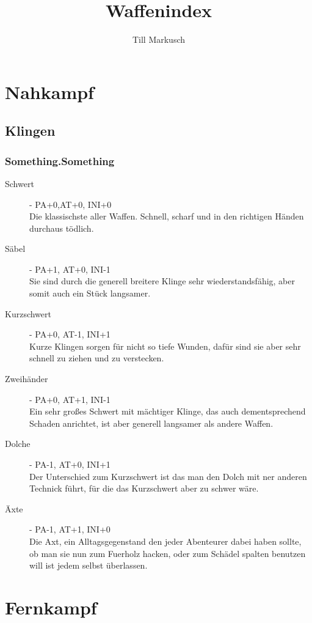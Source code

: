 \documentclass[a4paper,12pt,oneside]{book}
\title{Waffenindex}
\author{Till Markusch}
\date{}
\begin{document}
\maketitle
\tableofcontents

\chapter{Nahkampf}

\section{Klingen}

\subsection{Something.Something}

\begin{description}
\item[Schwert]- PA+0,AT+0, INI+0
\\Die klassischste aller Waffen. Schnell, scharf und in den richtigen Händen durchaus tödlich.
\item[Säbel]- PA+1, AT+0, INI-1
\\Sie sind durch die generell breitere Klinge sehr wiederstandsfähig, aber somit auch ein Stück langsamer.
\item[Kurzschwert] - PA+0, AT-1, INI+1
\\Kurze Klingen sorgen für nicht so tiefe Wunden, dafür sind sie aber sehr schnell zu ziehen und zu verstecken.
\item[Zweihänder] - PA+0, AT+1, INI-1
\\Ein sehr großes Schwert mit mächtiger Klinge, das auch dementsprechend Schaden anrichtet, ist aber generell langsamer als andere Waffen.
\item[Dolche] - PA-1, AT+0, INI+1
\\Der Unterschied zum Kurzschwert ist das man den Dolch mit ner anderen Technick führt, für die das Kurzschwert aber zu schwer wäre.
\item[Äxte] - PA-1, AT+1, INI+0
\\Die Axt, ein Alltagsgegenstand den jeder Abenteurer dabei haben sollte, ob man sie nun zum Fuerholz hacken, oder zum Schädel spalten benutzen will ist jedem selbst überlassen.
\end{description}

\chapter{Fernkampf}
\end{document}
